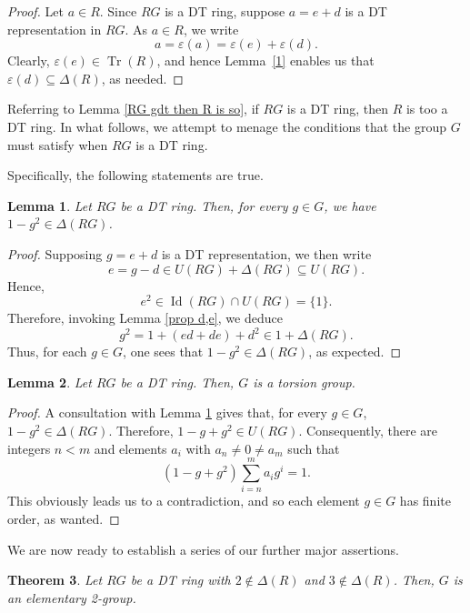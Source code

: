 \documentclass[12pt]{amsart}
\newtheorem{theorem}{Theorem}[section]
\newtheorem{lemma}[theorem]{Lemma}
\theoremstyle{definition}
\begin{document}
\begin{proof}
Let $a \in R$. Since $RG$ is a DT ring, suppose $a = e + d$ is a DT representation in $RG$. As $a \in R$, we write
\[
a = \varepsilon(a) = \varepsilon(e) + \varepsilon(d).
\]
Clearly, $\varepsilon(e) \in \operatorname{Tr}(R)$, and hence Lemma~\ref{1} enables us that $\varepsilon(d) \subseteq \Delta(R)$, as needed.
\end{proof}

Referring to Lemma \ref{RG gdt then R is so}, if $RG$ is a DT ring, then $R$ is too a DT ring. In what follows, we attempt to menage the conditions that the group $G$ must satisfy when $RG$ is a DT ring.

\medskip

Specifically, the following statements are true.

\begin{lemma}\label{1-g2 in Delta}
Let $RG$ be a DT ring. Then, for every $g \in G$, we have $1-g^2 \in \Delta(RG)$.
\end{lemma}

\begin{proof}
Supposing $g = e + d$ is a DT representation, we then write $$e = g - d \in U(RG) + \Delta(RG) \subseteq U(RG).$$ Hence, $$e^2 \in \operatorname{Id}(RG) \cap U(RG) = \{1\}.$$ Therefore, invoking Lemma \ref{prop d,e}, we deduce
\[
g^2 = 1 + (ed + de) + d^2 \in 1 + \Delta(RG).
\]
Thus, for each $g \in G$, one sees that $1 - g^2 \in \Delta(RG)$, as expected.
\end{proof}

\begin{lemma}\label{G torsin}
Let $RG$ be a DT ring. Then, $G$ is a torsion group.
\end{lemma}

\begin{proof}
A consultation with Lemma \ref{1-g2 in Delta} gives that, for every $g \in G$, $1 - g^2 \in \Delta(RG)$. Therefore, $1 - g + g^2 \in U(RG)$. Consequently, there are integers $n < m$ and elements $a_i$ with $a_n \neq 0 \neq a_m$ such that
\[
(1 - g + g^2)\sum_{i=n}^{m} a_ig^i = 1.
\]
This obviously leads us to a contradiction, and so each element $g \in G$ has finite order, as wanted.
\end{proof}

We are now ready to establish a series of our further major assertions.

\begin{theorem}\label{p neq 2 and 3}
Let $RG$ be a DT ring with $2 \notin \Delta(R)$ and $3 \notin \Delta(R)$. Then, $G$ is an elementary 2-group.
\end{theorem}
\end{document}

